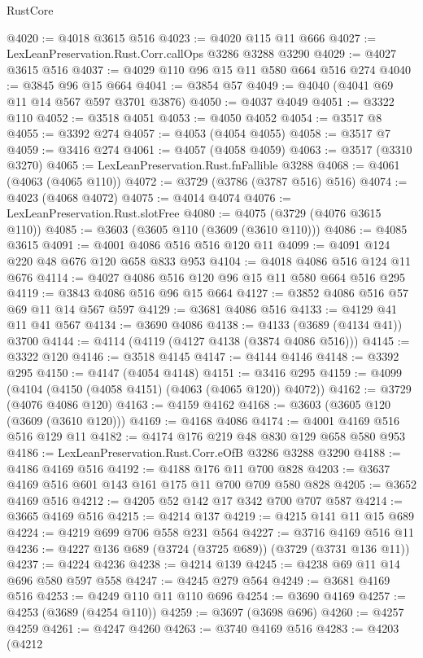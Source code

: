 \begin{lexlean}{RustCore}
\begin{coremodule}
@4020 := @4018 @3615 @516
@4023 := @4020 @115 @11 @666
@4027 := LexLeanPreservation.Rust.Corr.callOps @3286 @3288 @3290
@4029 := @4027 @3615 @516
@4037 := @4029 @110 @96 @15 @11 @580 @664 @516 @274
@4040 := @3845 @96 @15 @664
@4041 := @3854 @57
@4049 := @4040 (@4041 @69 @11 @14 @567 @597 @3701 @3876)
@4050 := @4037 @4049
@4051 := @3322 @110
@4052 := @3518 @4051
@4053 := @4050 @4052
@4054 := @3517 @8
@4055 := @3392 @274
@4057 := @4053 (@4054 @4055)
@4058 := @3517 @7
@4059 := @3416 @274
@4061 := @4057 (@4058 @4059)
@4063 := @3517 (@3310 @3270)
@4065 := LexLeanPreservation.Rust.fnFallible @3288
@4068 := @4061 (@4063 (@4065 @110))
@4072 := @3729 (@3786 (@3787 @516) @516)
@4074 := @4023 (@4068 @4072)
@4075 := @4014 @4074
@4076 := LexLeanPreservation.Rust.slotFree
@4080 := @4075 (@3729 (@4076 @3615 @110))
@4085 := @3603 (@3605 @110 (@3609 (@3610 @110)))
@4086 := @4085 @3615
@4091 := @4001 @4086 @516 @516 @120 @11
@4099 := @4091 @124 @220 @48 @676 @120 @658 @833 @953
@4104 := @4018 @4086 @516 @124 @11 @676
@4114 := @4027 @4086 @516 @120 @96 @15 @11 @580 @664 @516 @295
@4119 := @3843 @4086 @516 @96 @15 @664
@4127 := @3852 @4086 @516 @57 @69 @11 @14 @567 @597
@4129 := @3681 @4086 @516
@4133 := @4129 @41 @11 @41 @567
@4134 := @3690 @4086
@4138 := @4133 (@3689 (@4134 @41)) @3700
@4144 := @4114 (@4119 (@4127 @4138 (@3874 @4086 @516)))
@4145 := @3322 @120
@4146 := @3518 @4145
@4147 := @4144 @4146
@4148 := @3392 @295
@4150 := @4147 (@4054 @4148)
@4151 := @3416 @295
@4159 := @4099 (@4104 (@4150 (@4058 @4151) (@4063 (@4065 @120)) @4072))
@4162 := @3729 (@4076 @4086 @120)
@4163 := @4159 @4162
@4168 := @3603 (@3605 @120 (@3609 (@3610 @120)))
@4169 := @4168 @4086
@4174 := @4001 @4169 @516 @516 @129 @11
@4182 := @4174 @176 @219 @48 @830 @129 @658 @580 @953
@4186 := LexLeanPreservation.Rust.Corr.eOfB @3286 @3288 @3290
@4188 := @4186 @4169 @516
@4192 := @4188 @176 @11 @700 @828
@4203 := @3637 @4169 @516 @601 @143 @161 @175 @11 @700 @709 @580 @828
@4205 := @3652 @4169 @516
@4212 := @4205 @52 @142 @17 @342 @700 @707 @587
@4214 := @3665 @4169 @516
@4215 := @4214 @137
@4219 := @4215 @141 @11 @15 @689
@4224 := @4219 @699 @706 @558 @231 @564
@4227 := @3716 @4169 @516 @11
@4236 := @4227 @136 @689 (@3724 (@3725 @689)) (@3729 (@3731 @136 @11))
@4237 := @4224 @4236
@4238 := @4214 @139
@4245 := @4238 @69 @11 @14 @696 @580 @597 @558
@4247 := @4245 @279 @564
@4249 := @3681 @4169 @516
@4253 := @4249 @110 @11 @110 @696
@4254 := @3690 @4169
@4257 := @4253 (@3689 (@4254 @110))
@4259 := @3697 (@3698 @696)
@4260 := @4257 @4259
@4261 := @4247 @4260
@4263 := @3740 @4169 @516
@4283 := @4203
    (@4212

\end{coremodule}
\end{lexlean}
